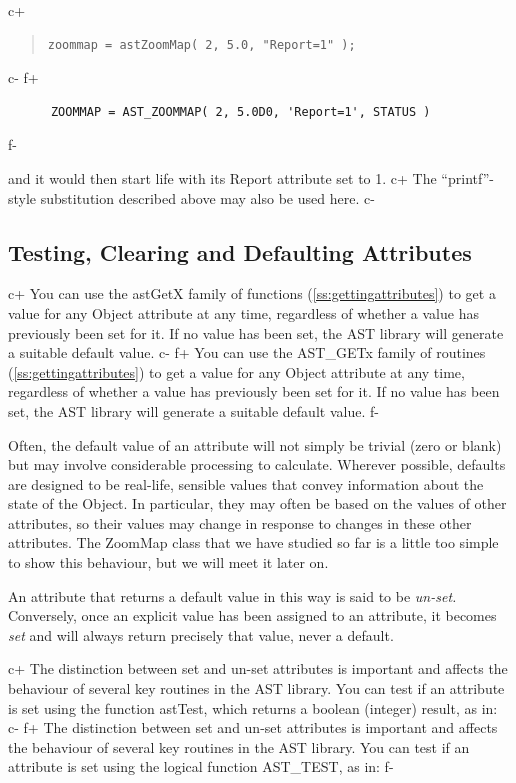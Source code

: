 \documentclass[twoside,11pt]{article}
\newcommand{\secref}[1]{\S\ref{#1}}
\renewcommand{\secref}[1]{\ref{#1}}
\begin{document}
c+
\begin{quote}
\small
\begin{verbatim}
zoommap = astZoomMap( 2, 5.0, "Report=1" );
\end{verbatim}
\normalsize
\end{quote}
c-
f+
\small
\begin{verbatim}
      ZOOMMAP = AST_ZOOMMAP( 2, 5.0D0, 'Report=1', STATUS )
\end{verbatim}
\normalsize
f-

and it would then start life with its Report attribute set to 1.
c+
The ``printf''-style substitution described above may also be used
here.
c-

\subsection{\label{ss:defaultingattributes}Testing, Clearing and Defaulting Attributes}

c+
You can use the astGetX family of functions
(\secref{ss:gettingattributes}) to get a value for any Object attribute
at any time, regardless of whether a value has previously been set for
it. If no value has been set, the AST library will generate a suitable
default value.
c-
f+
You can use the AST\_GETx family of routines
(\secref{ss:gettingattributes}) to get a value for any Object attribute
at any time, regardless of whether a value has previously been set for
it. If no value has been set, the AST library will generate a suitable
default value.
f-

Often, the default value of an attribute will not simply be trivial
(zero or blank) but may involve considerable processing to
calculate. Wherever possible, defaults are designed to be real-life,
sensible values that convey information about the state of the
Object. In particular, they may often be based on the values of other
attributes, so their values may change in response to changes in these
other attributes. The ZoomMap class that we have studied so far is a
little too simple to show this behaviour, but we will meet it later
on.

An attribute that returns a default value in this way is said to be
{\em{un-set.}} Conversely, once an explicit value has been assigned to
an attribute, it becomes {\em{set}} and will always return precisely
that value, never a default.

c+
The distinction between set and un-set attributes is important and
affects the behaviour of several key routines in the AST library. You
can test if an attribute is set using the function astTest, which
returns a boolean (integer) result, as in:
c-
f+
The distinction between set and un-set attributes is important and
affects the behaviour of several key routines in the AST library. You
can test if an attribute is set using the logical function AST\_TEST,
as in:
f-
\end{document}
